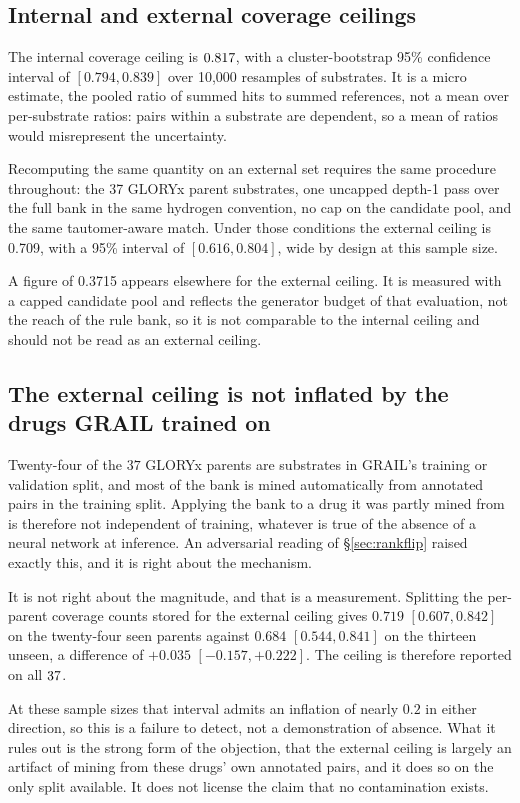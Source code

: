 \subsection{Internal and external coverage ceilings}

The internal coverage ceiling is $0.817$, with a cluster-bootstrap 95\% confidence interval of
$[0.794,0.839]$ over 10{,}000 resamples of substrates. It is a micro estimate, the pooled ratio
of summed hits to summed references, not a mean over per-substrate ratios: pairs within a
substrate are dependent, so a mean of ratios would misrepresent the uncertainty.

Recomputing the same quantity on an external set requires the same procedure throughout: the 37
GLORYx parent substrates, one uncapped depth-1 pass over the full bank in the same hydrogen
convention, no cap on the candidate pool, and the same tautomer-aware match. Under those conditions
the external ceiling is 0.709, with a 95\% interval of $[0.616,0.804]$, wide by design at this
sample size.

A figure of 0.3715 appears elsewhere for the external ceiling. It is measured with a
capped candidate pool and reflects the generator budget of that evaluation, not the
reach of the rule bank, so it is not comparable to the internal ceiling and should not be read
as an external ceiling.

\subsection{The external ceiling is not inflated by the drugs GRAIL trained on}

Twenty-four of the $37$ GLORYx parents are substrates in GRAIL's training or validation split, and
most of the bank is mined automatically from annotated pairs in the training split. Applying the
bank to a drug it was partly mined from is therefore not independent of training, whatever is true
of the absence of a neural network at inference. An adversarial reading of \S\ref{sec:rankflip}
raised exactly this, and it is right about the mechanism.

It is not right about the magnitude, and that is a measurement. Splitting the per-parent coverage
counts stored for the external ceiling gives $0.719$ $[0.607,0.842]$ on the twenty-four seen
parents against $0.684$ $[0.544,0.841]$ on the thirteen unseen, a difference of $+0.035$
$[-0.157,+0.222]$. The ceiling is therefore reported on all $37$.

At these sample sizes that interval admits an inflation of nearly $0.2$ in either direction, so this
is a failure to detect, not a demonstration of absence. What it rules out is the strong form
of the objection, that the external ceiling is largely an artifact of mining from these drugs'
own annotated pairs, and it does so on the only split available. It does not license the claim
that no contamination exists.

